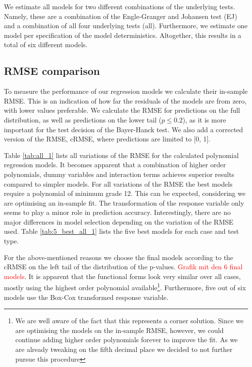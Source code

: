\documentclass[12pt,a4paper]{article}
\let\rmarkdownfootnote\footnote%
\def\footnote{\protect\rmarkdownfootnote}
\begin{document}
We estimate all models for two different combinations of the underlying
tests. Namely, these are a combination of the Engle-Granger and Johansen
test (EJ) and a combination of all four underlying tests (all).
Furthermore, we estimate one model per specification of the model
deterministics. Altogether, this results in a total of six different
models.

\hypertarget{rmse-comparison}{%
\subsection{RMSE comparison}\label{rmse-comparison}}

To measure the performance of our regression models we calculate their
in-sample RMSE. This is an indication of how far the residuals of the
models are from zero, with lower values preferable. We calculate the
RMSE for predictions on the full distribution, as well as predictions on
the lower tail (\(p \leq 0.2\)), as it is more important for the test
decision of the Bayer-Hanck test. We also add a corrected version of the
RMSE, cRMSE, where predictions are limited to {[}0, 1{]}.

Table \ref{tab:all_1} lists all variations of the RMSE for the
calculated polynomial regression models. It becomes apparent that a
combination of higher order polynomials, dummy variables and interaction
terms achieves superior results compared to simpler models. For all
variations of the RMSE the best models require a polynomial of minimum
grade 12. This can be expected, considering we are optimising an
in-sample fit. The transformation of the response variable only seems to
play a minor role in prediction accuracy. Interestingly, there are no
major differences in model selection depending on the variation of the
RMSE used. Table \ref{tab:5_best_all_1} lists the five best models for
each case and test type.

For the above-mentioned reasons we choose the final models according to
the cRMSE on the left tail of the distribution of the p-values.
\textcolor{red}{Grafik mit den 6 final models}. It is apparent that the
functional forms look very similar over all cases, mostly using the
highest order polynomial available\footnote{We are well aware of the
  fact that this represents a corner solution. Since we are optimising
  the models on the in-sample RMSE, however, we could continue adding
  higher order polynomials forever to improve the fit. As we are already
  tweaking on the fifth decimal place we decided to not further pursue
  this procedure}. Furthermore, five out of six models use the Box-Cox
transformed response variable.
\end{document}

